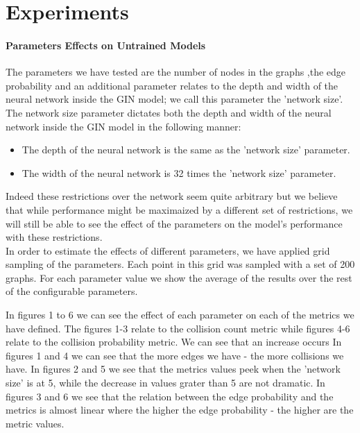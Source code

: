 \documentclass{article}
\begin{document}
\part*{Experiments}
\subsection*{Parameters Effects on Untrained Models}
The parameters we have tested are the number of nodes in the graphs ,the edge probability and an additional parameter
relates to the depth and width of the neural network inside the GIN model; we call this parameter the 'network size'.
The network size parameter dictates both the depth and width of the neural network inside the GIN model in the following manner:
\begin{itemize}
    \item The depth of the neural network is the same as the 'network size' parameter.
    \item The width of the neural network is 32 times the 'network size' parameter.
\end{itemize}
Indeed these restrictions over the network seem quite arbitrary but we believe that while performance might be maximaized by
a different set of restrictions, we will still be able to see the effect of the parameters on the model's performance with these restrictions.\\
In order to estimate the effects of different parameters, we have applied grid sampling of the parameters.
Each point in this grid was sampled with a set of 200 graphs.
For each parameter value we show the average of the results over the rest of the configurable parameters.

In figures 1 to 6 we can see the effect of each parameter on each of the metrics we have defined.
The figures 1-3 relate to the collision count metric while figures 4-6 relate to the collision probability metric.
We can see that an increase occurs In figures 1 and 4 we can see that the more edges we have - the more collisions we have.
In figures 2 and 5 we see that the metrics values peek when the 'network size' is at 5,
while the decrease in values grater than 5 are not dramatic.
In figures 3 and 6 we see that the relation between the edge probability and the metrics is almost linear where the
higher the edge probability - the higher are the metric values.
\end{document}
